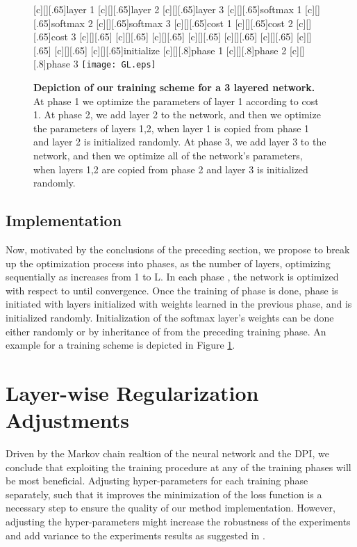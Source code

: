 \documentclass{article}
\begin{document}
\begin{figure}[!ht]
  \centering
  [c][][.65]{layer 1}
  [c][][.65]{layer 2}
  [c][][.65]{layer 3}
  [c][][.65]{softmax 1}
  [c][][.65]{softmax 2}             
  [c][][.65]{softmax 3}             
  [c][][.65]{cost 1}              
  [c][][.65]{cost 2}    
  [c][][.65]{cost 3}             
  [c][][.65]{}    
  [c][][.65]{}      
  [c][][.65]{}        
  [c][][.65]{}        
  [c][][.65]{}        
  [c][][.65]{}        
  [c][][.65]{}        
  [c][][.65]{}        
  [c][][.65]{initialize}        
  [c][][.8]{phase 1}          
  [c][][.8]{phase 2}          
  [c][][.8]{phase 3}                
  \texttt{[image: GL.eps]}
  \caption{\textbf{Depiction of our training scheme for a 3 layered network.} At phase 1 we optimize the parameters of layer 1 according to cost 1. At phase 2, we add layer 2 to the network, and then we optimize the parameters of layers 1,2, when layer 1 is copied from phase 1 and layer 2 is initialized randomly.  At phase 3, we add layer 3 to the network, and then we optimize all of the network's parameters, when layers 1,2 are copied from phase 2 and layer 3 is initialized randomly.}
  \label{learning_scheme}
\end{figure}

\subsection{Implementation}

Now, motivated by the conclusions of the preceding section, we propose to break up the optimization process into  phases, as the number of layers, optimizing  sequentially as  increases from 1 to L.
In each phase , the network is optimized with respect to  until convergence. 
Once the training of phase  is done, phase  is initiated with layers  initialized with weights  learned in the previous phase, and  is initialized randomly. Initialization of the softmax layer's weights  can be done either randomly or by inheritance of  from the preceding training phase. An example for a training scheme is depicted in Figure \ref{learning_scheme}.




\section{Layer-wise Regularization Adjustments}
Driven by the Markov chain realtion of the neural network and the DPI, we conclude that exploiting the training procedure at any of the training phases will be most beneficial. Adjusting hyper-parameters for each training phase separately, such that it improves the minimization of the loss function is a necessary step to ensure the quality of our method implementation. However, adjusting the hyper-parameters might increase the robustness of the experiments and add variance to the experiments results as suggested in \cite{melis2017state}.
\end{document}
